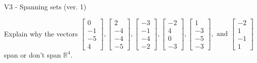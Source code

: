 \begin{exercise}
  \begin{exerciseTitle}V3 - Spanning sets (ver. 1)\end{exerciseTitle}
  \begin{exerciseStatement}
    Explain why the vectors \(\left[\begin{array}{r}
0 \\
-1 \\
-5 \\
4
\end{array}\right] , \left[\begin{array}{r}
2 \\
-4 \\
-4 \\
-5
\end{array}\right] , \left[\begin{array}{r}
-3 \\
-1 \\
-4 \\
-2
\end{array}\right] , \left[\begin{array}{r}
-2 \\
4 \\
0 \\
-3
\end{array}\right] , \left[\begin{array}{r}
1 \\
-3 \\
-5 \\
-3
\end{array}\right] , \text{ and } \left[\begin{array}{r}
-2 \\
1 \\
-1 \\
1
\end{array}\right]\) span or don't span \(\mathbb{R}^4\). 
	



\end{exerciseStatement}
\end{exercise}

